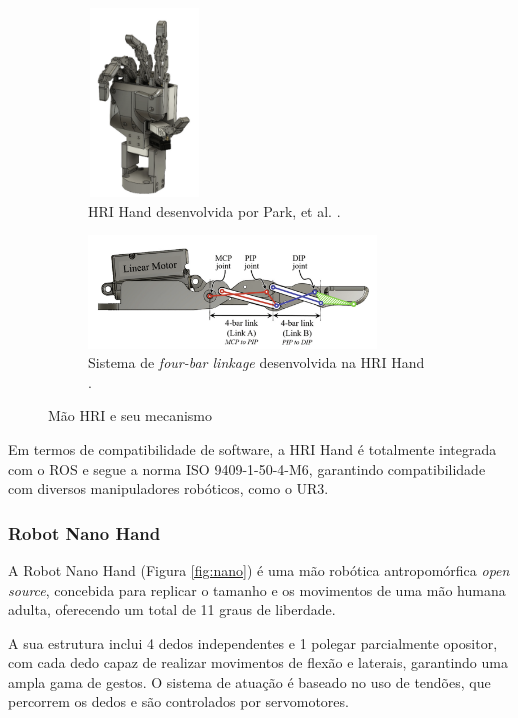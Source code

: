 \begin{figure}[h]
    \centering
    \begin{subfigure}[b]{0.45\textwidth} 
        \centering
        \includegraphics[height=5cm,width=3cm]{figs/chapter2/hri.png}
        \caption{HRI Hand desenvolvida por Park, et al. \cite{Park2020}.}
        \label{fig:imagem1}
    \end{subfigure}
    \hfill
    \begin{subfigure}[b]{0.45\textwidth} 
        \centering
        \includegraphics[height=3cm,width=\textwidth]{figs/chapter2/four-bar linkage.png}
        \caption{Sistema de \textit{four-bar linkage} desenvolvida na HRI Hand \cite{Park2020}.}
        \label{fig:imagem2}
    \end{subfigure}
    \caption{Mão HRI e seu mecanismo}
    \label{fig:hri}
\end{figure}

Em termos de compatibilidade de software, a HRI Hand é totalmente integrada com o \ac{ROS} e segue a norma ISO 9409-1-50-4-M6, garantindo compatibilidade com diversos manipuladores robóticos, como o UR3.


\subsubsection{Robot Nano Hand}

A Robot Nano Hand \cite{Nano} (Figura \ref{fig:nano}) é uma mão robótica antropomórfica \textit{open source}, concebida para replicar o tamanho e os movimentos de uma mão humana adulta, oferecendo um total de 11 graus de liberdade. 

A sua estrutura inclui 4 dedos independentes e 1 polegar parcialmente opositor, com cada dedo capaz de realizar movimentos de flexão e laterais, garantindo uma ampla gama de gestos. O sistema de atuação é baseado no uso de tendões, que percorrem os dedos e são controlados por servomotores.

